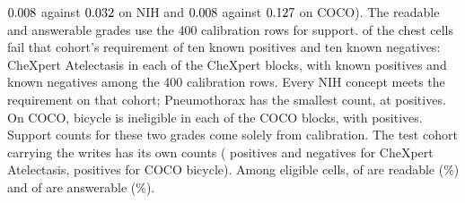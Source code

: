 $0.008$ against $0.032$ on NIH and $0.008$ against $0.127$ on COCO). The readable and answerable grades use the 400 calibration rows for support. \cfSupportInelChest{} of the \cfChestCellsN{} chest cells fail that cohort's requirement of ten known positives and ten known negatives: CheXpert Atelectasis in each of the \cfSupportInelChexBlocks{} CheXpert blocks, with \cfCalChexInelPos{} known positives and \cfCalChexInelNeg{} known negatives among the 400 calibration rows. Every NIH concept meets the requirement on that cohort; Pneumothorax has the smallest count, at \cfCalNihMinPos{} positives. On COCO, bicycle is ineligible in each of the \cfSupportInelCocoBlocks{} COCO blocks, with \cfCalCocoInelPos{} positives. Support counts for these two grades come solely from calibration. The test cohort carrying the writes has its own counts (\cfTestChexInelPos{} positives and \cfTestChexInelNeg{} negatives for CheXpert Atelectasis, \cfTestCocoInelPos{} positives for COCO bicycle). Among eligible cells, \cfSupportReadableChest{} of \cfSupportReadableNChest{} are readable (\cfSupportReadablePctChest\%) and \cfSupportAnswerableChest{} of \cfSupportAnswerableNChest{} are answerable (\cfSupportAnswerablePctChest\%).

